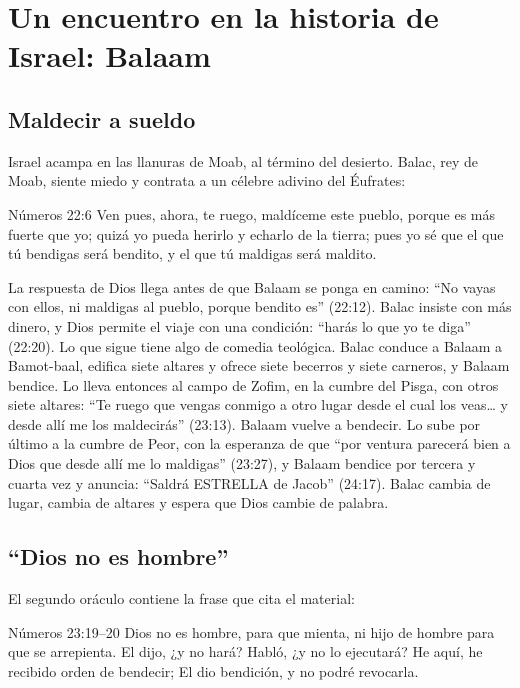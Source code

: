 
\section{Un encuentro en la historia de Israel: Balaam}

\subsection{Maldecir a sueldo}
Israel acampa en las llanuras de Moab, al término del desierto. Balac, rey de Moab, siente miedo y contrata a un célebre adivino del Éufrates:

\begin{verso}{Números 22:6}
Ven pues, ahora, te ruego, maldíceme este pueblo, porque es más fuerte que yo; quizá yo pueda herirlo y echarlo de la tierra; pues yo sé que el que tú bendigas será bendito, y el que tú maldigas será maldito.
\end{verso}

La respuesta de Dios llega antes de que Balaam se ponga en camino: ``No vayas con ellos, ni maldigas al pueblo, porque bendito es'' (22:12). Balac insiste con más dinero, y Dios permite el viaje con una condición: ``harás lo que yo te diga'' (22:20). Lo que sigue tiene algo de comedia teológica. Balac conduce a Balaam a Bamot-baal, edifica siete altares y ofrece siete becerros y siete carneros, y Balaam bendice. Lo lleva entonces al campo de Zofim, en la cumbre del Pisga, con otros siete altares: ``Te ruego que vengas conmigo a otro lugar desde el cual los veas\ldots{} y desde allí me los maldecirás'' (23:13). Balaam vuelve a bendecir. Lo sube por último a la cumbre de Peor, con la esperanza de que ``por ventura parecerá bien a Dios que desde allí me lo maldigas'' (23:27), y Balaam bendice por tercera y cuarta vez y anuncia: ``Saldrá ESTRELLA de Jacob'' (24:17). Balac cambia de lugar, cambia de altares y espera que Dios cambie de palabra.

\subsection{“Dios no es hombre”}
El segundo oráculo contiene la frase que cita el material:

\begin{verso}{Números 23:19–20}
Dios no es hombre, para que mienta, ni hijo de hombre para que se arrepienta. El dijo, ¿y no hará? Habló, ¿y no lo ejecutará? He aquí, he recibido orden de bendecir; El dio bendición, y no podré revocarla.
\end{verso}

